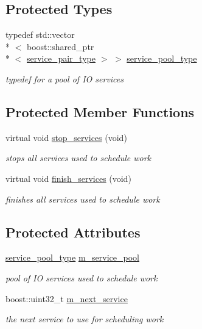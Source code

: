 \subsection*{Protected Types}
\begin{DoxyCompactItemize}
\item 
typedef std\-::vector\\*
$<$ boost\-::shared\-\_\-ptr\\*
$<$ \hyperlink{structpion_1_1one__to__one__scheduler_1_1service__pair__type}{service\-\_\-pair\-\_\-type} $>$ $>$ \hyperlink{classpion_1_1one__to__one__scheduler_ac41a2d4f38f49673139a77e609b1d084}{service\-\_\-pool\-\_\-type}
\begin{DoxyCompactList}\small\item\em typedef for a pool of I\-O services \end{DoxyCompactList}\end{DoxyCompactItemize}
\subsection*{Protected Member Functions}
\begin{DoxyCompactItemize}
\item 
virtual void \hyperlink{classpion_1_1one__to__one__scheduler_a39c02d4a67bf5cd28da3ce22363dd698}{stop\-\_\-services} (void)
\begin{DoxyCompactList}\small\item\em stops all services used to schedule work \end{DoxyCompactList}\item 
virtual void \hyperlink{classpion_1_1one__to__one__scheduler_a3e9f1380789598587a27f0857e7c9133}{finish\-\_\-services} (void)
\begin{DoxyCompactList}\small\item\em finishes all services used to schedule work \end{DoxyCompactList}\end{DoxyCompactItemize}
\subsection*{Protected Attributes}
\begin{DoxyCompactItemize}
\item 
\hyperlink{classpion_1_1one__to__one__scheduler_ac41a2d4f38f49673139a77e609b1d084}{service\-\_\-pool\-\_\-type} \hyperlink{classpion_1_1one__to__one__scheduler_a8b6ae075086a579e46ca08a89085c07a}{m\-\_\-service\-\_\-pool}
\begin{DoxyCompactList}\small\item\em pool of I\-O services used to schedule work \end{DoxyCompactList}\item 
boost\-::uint32\-\_\-t \hyperlink{classpion_1_1one__to__one__scheduler_ae4e2b2a157c1c9e36694e86b6ae354b1}{m\-\_\-next\-\_\-service}
\begin{DoxyCompactList}\small\item\em the next service to use for scheduling work \end{DoxyCompactList}\end{DoxyCompactItemize}
